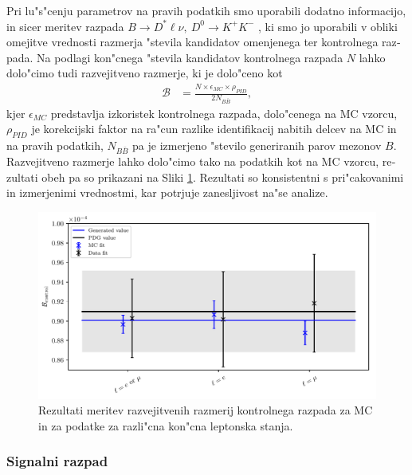 \begin{otherlanguage}{slovene}
Pri lu"s"cenju parametrov na pravih podatkih smo uporabili dodatno informacijo, in sicer meritev razpada $B\to D^* \ell \nu,~D^0 \to K^+K^-$ \cite{Amhis:2016xyh,tanabashi2018review}, ki smo jo uporabili v obliki omejitve vrednosti razmerja "stevila kandidatov omenjenega ter kontrolnega razpada. Na podlagi kon"cnega "stevila kandidatov kontrolnega razpada $N$ lahko dolo"cimo tudi razvejitveno razmerje, ki je dolo"ceno kot
\begin{align}
\mathcal{B} &= \frac{N \times \epsilon_{MC} \times \rho_{PID}}{2N_{B\bar B}},
\label{eq:br_data_si}
\end{align}
kjer $\epsilon_{MC}$ predstavlja izkoristek kontrolnega razpada, dolo"cenega na MC vzorcu, $\rho_{PID}$ je korekcijski faktor na ra"cun razlike identifikacij nabitih delcev na MC in na pravih podatkih, $N_{B\bar B}$ pa je izmerjeno "stevilo generiranih parov mezonov $B$. Razvejitveno razmerje lahko dolo"cimo tako na podatkih kot na MC vzorcu, rezultati obeh pa so prikazani na Sliki \ref{fig:br_plot_si}. Rezultati so konsistentni s pri"cakovanimi in izmerjenimi vrednostmi, kar potrjuje zanesljivost na"se analize.

\begin{figure}[H]
	\centering
	\captionsetup{width=0.8\linewidth}
	\includegraphics[width=\linewidth]{fig/br_plot}
	\caption{Rezultati meritev razvejitvenih razmerij kontrolnega razpada za MC in za podatke za razli"cna kon"cna leptonska stanja.}
	\label{fig:br_plot_si}
\end{figure}

\subsubsection{Signalni razpad}


\end{otherlanguage}
